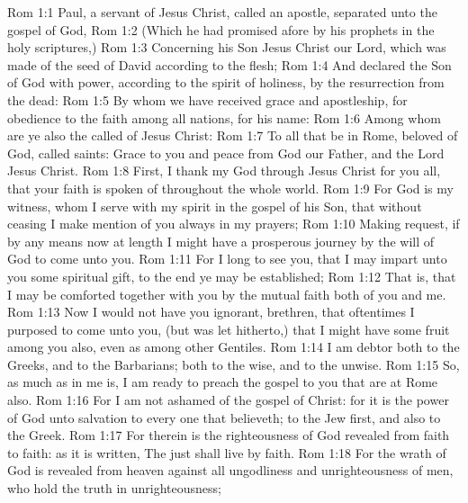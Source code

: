 \vs Rom 1:1 Paul, a servant of Jesus Christ, called  an apostle, separated unto the gospel of God,
\vs Rom 1:2 (Which he had promised afore by his prophets in the holy scriptures,)
\vs Rom 1:3 Concerning his Son Jesus Christ our Lord, which was made of the seed of David according to the flesh;
\vs Rom 1:4 And declared  the Son of God with power, according to the spirit of holiness, by the resurrection from the dead:
\vs Rom 1:5 By whom we have received grace and apostleship, for obedience to the faith among all nations, for his name:
\vs Rom 1:6 Among whom are ye also the called of Jesus Christ:
\vs Rom 1:7 To all that be in Rome, beloved of God, called  saints: Grace to you and peace from God our Father, and the Lord Jesus Christ.
\vs Rom 1:8 First, I thank my God through Jesus Christ for you all, that your faith is spoken of throughout the whole world.
\vs Rom 1:9 For God is my witness, whom I serve with my spirit in the gospel of his Son, that without ceasing I make mention of you always in my prayers;
\vs Rom 1:10 Making request, if by any means now at length I might have a prosperous journey by the will of God to come unto you.
\vs Rom 1:11 For I long to see you, that I may impart unto you some spiritual gift, to the end ye may be established;
\vs Rom 1:12 That is, that I may be comforted together with you by the mutual faith both of you and me.
\vs Rom 1:13 Now I would not have you ignorant, brethren, that oftentimes I purposed to come unto you, (but was let hitherto,) that I might have some fruit among you also, even as among other Gentiles.
\vs Rom 1:14 I am debtor both to the Greeks, and to the Barbarians; both to the wise, and to the unwise.
\vs Rom 1:15 So, as much as in me is, I am ready to preach the gospel to you that are at Rome also.
\vs Rom 1:16 For I am not ashamed of the gospel of Christ: for it is the power of God unto salvation to every one that believeth; to the Jew first, and also to the Greek.
\vs Rom 1:17 For therein is the righteousness of God revealed from faith to faith: as it is written, The just shall live by faith.
\vs Rom 1:18 For the wrath of God is revealed from heaven against all ungodliness and unrighteousness of men, who hold the truth in unrighteousness;
